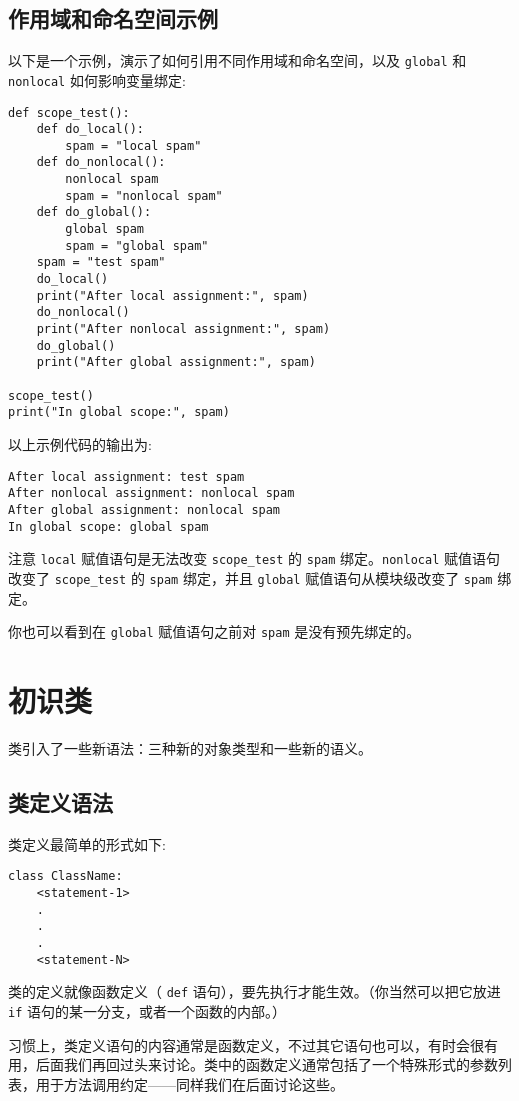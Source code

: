 \subsection{作用域和命名空间示例}
以下是一个示例，演示了如何引用不同作用域和命名空间，以及 \texttt{global} 和 \texttt{nonlocal} 如何影响变量绑定:
\begin{lstlisting}
def scope_test():
    def do_local():
        spam = "local spam"
    def do_nonlocal():
        nonlocal spam
        spam = "nonlocal spam"
    def do_global():
        global spam
        spam = "global spam"
    spam = "test spam"
    do_local()
    print("After local assignment:", spam)
    do_nonlocal()
    print("After nonlocal assignment:", spam)
    do_global()
    print("After global assignment:", spam)

scope_test()
print("In global scope:", spam)
\end{lstlisting}
以上示例代码的输出为:
\begin{Verbatim}[fontfamily=tt]
After local assignment: test spam
After nonlocal assignment: nonlocal spam
After global assignment: nonlocal spam
In global scope: global spam
\end{Verbatim}
\begin{Warning}{注意}
\texttt{local} 赋值语句是无法改变 \texttt{scope\_test} 的 \texttt{spam} 绑定。\texttt{nonlocal} 赋值语句改变了 \texttt{scope\_test} 的 \texttt{spam} 绑定，并且 \texttt{global} 赋值语句从模块级改变了 \texttt{spam} 绑定。
\end{Warning}
你也可以看到在 \texttt{global} 赋值语句之前对 \texttt{spam} 是没有预先绑定的。
\section{初识类\label{Class:FirstLook}}
类引入了一些新语法：三种新的对象类型和一些新的语义。
\subsection{类定义语法}
类定义最简单的形式如下:
\begin{lstlisting}
class ClassName:
    <statement-1>
    .
    .
    .
    <statement-N>
\end{lstlisting}
类的定义就像函数定义（ \texttt{def} 语句），要先执行才能生效。（你当然可以把它放进 \texttt{if} 语句的某一分支，或者一个函数的内部。）

习惯上，类定义语句的内容通常是函数定义，不过其它语句也可以，有时会很有用，后面我们再回过头来讨论。类中的函数定义通常包括了一个特殊形式的参数列表，用于方法调用约定——同样我们在后面讨论这些。

